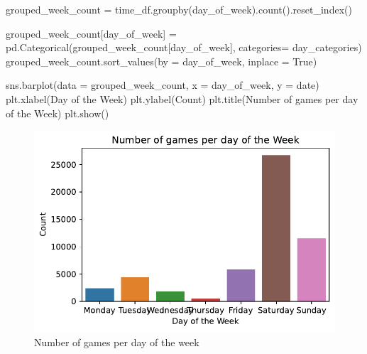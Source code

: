 \documentclass[
  letterpaper,
  DIV=11,
  numbers=noendperiod]{scrartcl}
\newenvironment{Shaded}{\begin{snugshade}}{\end{snugshade}}
\newcommand{\NormalTok}[1]{\textcolor[rgb]{0.00,0.23,0.31}{#1}}
\newcommand{\OperatorTok}[1]{\textcolor[rgb]{0.37,0.37,0.37}{#1}}
\newcommand{\StringTok}[1]{\textcolor[rgb]{0.13,0.47,0.30}{#1}}
\newcommand{\VariableTok}[1]{\textcolor[rgb]{0.07,0.07,0.07}{#1}}
\begin{document}
\begin{Shaded}
\begin{Highlighting}[]
\NormalTok{grouped\_week\_count }\OperatorTok{=}\NormalTok{ time\_df.groupby(}\StringTok{\textquotesingle{}day\_of\_week\textquotesingle{}}\NormalTok{).count().reset\_index()}

\NormalTok{grouped\_week\_count[}\StringTok{\textquotesingle{}day\_of\_week\textquotesingle{}}\NormalTok{] }\OperatorTok{=}\NormalTok{ pd.Categorical(grouped\_week\_count[}\StringTok{\textquotesingle{}day\_of\_week\textquotesingle{}}\NormalTok{], categories}\OperatorTok{=}\NormalTok{ day\_categories)}
\NormalTok{grouped\_week\_count.sort\_values(by }\OperatorTok{=} \StringTok{\textquotesingle{}day\_of\_week\textquotesingle{}}\NormalTok{, inplace }\OperatorTok{=} \VariableTok{True}\NormalTok{)}


\NormalTok{sns.barplot(data }\OperatorTok{=}\NormalTok{ grouped\_week\_count, x }\OperatorTok{=} \StringTok{\textquotesingle{}day\_of\_week\textquotesingle{}}\NormalTok{, y }\OperatorTok{=} \StringTok{\textquotesingle{}date\textquotesingle{}}\NormalTok{)}
\NormalTok{plt.xlabel(}\StringTok{\textquotesingle{}Day of the Week\textquotesingle{}}\NormalTok{)}
\NormalTok{plt.ylabel(}\StringTok{\textquotesingle{}Count\textquotesingle{}}\NormalTok{)}
\NormalTok{plt.title(}\StringTok{\textquotesingle{}Number of games per day of the Week\textquotesingle{}}\NormalTok{)}
\NormalTok{plt.show()}
\end{Highlighting}
\end{Shaded}

\begin{figure}[H]

{\centering \includegraphics{Blog_post_files/figure-pdf/fig-count_day-output-1.pdf}

}

\caption{\label{fig-count_day}Number of games per day of the week}

\end{figure}
\end{document}

